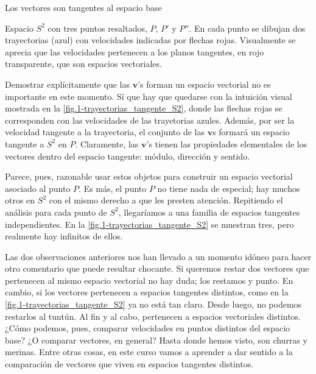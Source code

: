 \begin{observation}{Los vectores son tangentes al espacio base}
    \begin{figbox}{
        Espacio \(S^2\) con tres puntos resaltados, \(P\), \(P'\) y \(P''\). En cada punto se dibujan dos trayectorias (azul) con velocidades indicadas por flechas rojas. Visualmente se aprecia que las velocidades pertenecen a los planos tangentes, en rojo transparente, que son espacios vectoriales.
        \label{fig.1-trayectorias_tangente_S2}}
        
    \end{figbox}

    Demostrar explícitamente que las \(\mathbf{v}\)'s forman un espacio vectorial no es importante en este momento. Sí que hay que quedarse con la intuición visual mostrada en la \cref{fig.1-trayectorias_tangente_S2}, donde las flechas rojas se corresponden con las velocidades de las trayetorias azules. Además, por ser la velocidad tangente a la trayectoria, el conjunto de las \(\mathbf{v}\)s formará un espacio tangente a \(S^2\) en \(P\).
    Claramente, las \(\mathbf{v}\)'s tienen las propiedades elementales de los vectores dentro del espacio tangente: módulo, dirección y sentido. 
    
    Parece, pues, razonable usar estos objetos para construir un espacio vectorial asociado al punto \(P\). Es más, el punto \(P\) no tiene nada de especial; hay muchos otros en \(S^2\) con el mismo derecho a que les presten atención. Repitiendo el análisis para cada punto de \(S^2\), llegaríamos a una familia de espacios tangentes independientes. En la \cref{fig.1-trayectorias_tangente_S2} se muestran tres, pero realmente hay infinitos de ellos.
    
    Las dos observaciones anteriores nos han llevado a un momento idóneo para hacer otro comentario que puede resultar chocante. Si queremos restar dos vectores que pertenecen al mismo espacio vectorial no hay duda; los restamos y punto. En cambio, si los vectores pertenecen a espacios tangentes distintos, como en la \cref{fig.1-trayectorias_tangente_S2} ya no está tan claro. Desde luego, no podemos restarlos al tuntún. Al fin y al cabo, pertenecen a espacios vectoriales distintos. ¿Cómo podemos, pues, comparar velocidades en puntos distintos del espacio base? ¿O comparar vectores, en general? Hasta donde hemos visto, son churras y merinas. Entre otras cosas, en este curso vamos a aprender a dar sentido a la comparación de vectores que viven en espacios tangentes distintos.
    

\end{observation}
